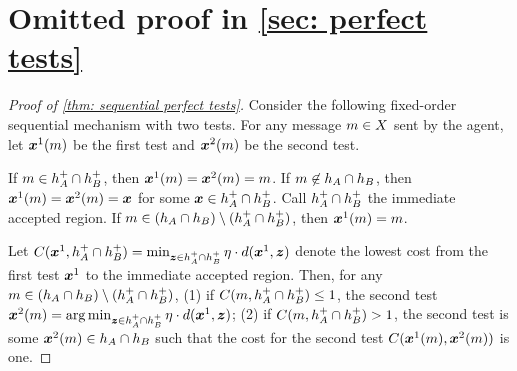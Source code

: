 \section{Omitted proof in \cref{sec: perfect tests}}\label{appendix: perfect tests}


\begin{proof}[Proof of \cref{thm: sequential perfect tests}]
     Consider the following fixed-order sequential mechanism with two tests.
     For any message $m\in X$ sent by the agent, let $\boldsymbol{x}^1(m)$ be the  first test and $\boldsymbol{x}^2(m)$ be the second test.
      
     If $m \in h_A^+\cap h_B^+$, then $\boldsymbol{x}^1(m)=\boldsymbol{x}^2(m)=m$.
     If $m\not\in h_A \cap h_B$, then $\boldsymbol{x}^1(m)=\boldsymbol{x}^2(m)=\boldsymbol{x}$ for some $\boldsymbol{x} \in h_A^+\cap h_B^+$.
     Call  $h_A^+\cap h_B^+$ the immediate accepted region.
    If $m\in (h_A \cap h_B) \setminus (h_A^+\cap h_B^+)$, then $\boldsymbol{x}^1(m)=m$. 
    
    
    
    
    Let  $C(\boldsymbol{x}^1, h_A^+\cap h_B^+) = \min_{\boldsymbol{z} \in h_A^+\cap h_B^+} \eta \cdot d(\boldsymbol{x}^1,\boldsymbol{z}) $ denote the lowest cost from the first test $\boldsymbol{x}^1$ to the immediate accepted region.
    Then, for any $m\in (h_A \cap h_B) \setminus (h_A^+\cap h_B^+)$, 
     (1) if $C(m, h_A^+\cap h_B^+) \leq 1$, the second test
     $\boldsymbol{x}^2(m)= \operatorname*{arg\,min}_{\boldsymbol{z} \in h_A^+\cap h_B^+} \eta \cdot d(\boldsymbol{x}^1,\boldsymbol{z}) $; (2) if $C(m, h_A^+\cap h_B^+) > 1$,  the second test is some $\boldsymbol{x}^2(m)\in h_A \cap h_B$ such that the  cost for the second test $C(\boldsymbol{x}^1(m),\boldsymbol{x}^2(m))$ is one.  



\end{proof}
